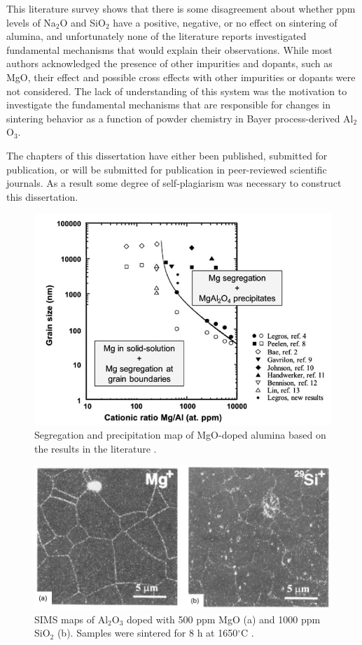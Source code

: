 This literature survey shows that there is some disagreement about whether ppm levels of Na$_{2}$O and SiO$_{2}$ have a positive, negative, or no effect on sintering of alumina, and unfortunately none of the literature reports investigated fundamental mechanisms that would explain their observations. While most authors acknowledged the presence of other impurities and dopants, such as MgO, their effect and possible cross effects with other impurities or dopants were not considered. The lack of understanding of this system was the motivation to investigate the fundamental mechanisms that are responsible for changes in sintering behavior as a function of powder chemistry in Bayer process-derived Al$_{2}$O$_{3}$.

The chapters of this dissertation have either been published, submitted for publication, or will be submitted for publication in peer-reviewed scientific journals. As a result some degree of self-plagiarism was necessary to construct this dissertation.

\newpage
\begin{figure}[H]
	\centering
	\includegraphics{Chapter-1/Figures/Figure1.png}
	\caption{Segregation and precipitation map of MgO-doped alumina based on the results in the literature \cite{Zuo2013}.}
	\label{Ch1-figure:Figure1}
\end{figure}

\newpage
\begin{figure}[H]
	\centering
	\includegraphics{Chapter-1/Figures/Figure2.png}
	\caption{SIMS maps of Al$_{2}$O$_{3}$ doped with 500 ppm MgO (a) and 1000 ppm SiO$_{2}$ (b). Samples were sintered for 8 h at 1650$^{\circ}$C \cite{Gavrilov1999}.}
	\label{Ch1-figure:Figure2}
\end{figure}

